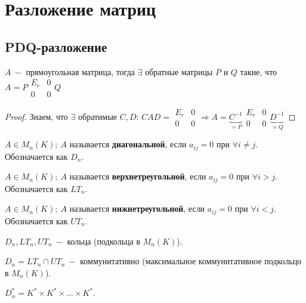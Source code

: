 \section{Разложение матриц}

\subsection{PDQ-разложение}

\begin{theorem}
    $A\ -$ прямоугольная матрица, тогда $\exists$ обратные матрицы $P$ и $Q$ такие, что $A=P\begin{array}{c|c}E_r & 0\\\hline 0 & 0\end{array}Q$
\end{theorem}

\begin{proof}
    Знаем, что $\exists$ обратимые $C,D$:
    $CAD=\begin{array}{c|c}E_r & 0\\\hline 0 & 0\end{array}\Rightarrow A = \underbrace{C^{-1}}_{=P}\begin{array}{c|c}E_r & 0\\\hline 0 & 0\end{array}\underbrace{D^{-1}}_{=Q}$
\end{proof}

\begin{definition}
    $A\in M_n(K);\ A$ называется \textbf{диагональной}, если $a_{ij}=0$ при $\forall i\neq j$. Обозначается как $D_n$.
\end{definition}

\begin{definition}
    $A\in M_n(K);\ A$ называется \textbf{верхнетреугольной}, если $a_{ij}=0$ при $\forall i> j$. Обозначается как $LT_n$.
\end{definition}

\begin{definition}
    $A\in M_n(K);\ A$ называется \textbf{нижнетреугольной}, если $a_{ij}=0$ при $\forall i< j$. Обозначается как $UT_n$.
\end{definition}

\begin{statement}
    $D_n,LT_n, UT_n\ -$ кольца (подкольца в $M_n(K)$).

    $D_n= LT_n\cap UT_n\ -$ коммунитативно (максимальное коммунитативное подкольцо в $M_n(K)$).

    $D_n^*=K^*\times K^*\times ... \times K^*$.
\end{statement}

